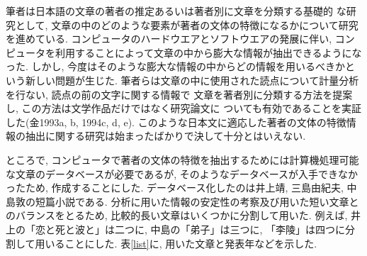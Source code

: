 筆者は日本語の文章の著者の推定あるいは著者別に文章を分類する基礎的
な研究として, 文章の中のどのような要素が著者の文体の特徴になるかについて研究を進めている. 
コンピュータのハードウエアとソフトウエアの発展に伴い, コンピュータを利用することによって文章の中から膨大な情報が抽出できるようになった. しかし, 今度はそのような膨大な情報の中からどの情報を用いるべきかという新しい問題が生じた.
筆者らは文章の中に使用された読点について計量分析を行ない, 読点の前の文字に関する情報で
文章を著者別に分類する方法を提案し, この方法は文学作品だけではなく研究論文に
ついても有効であることを実証した(金1993a, b, 1994c, d, e). このような日本文に適応した著者の文体の特徴情報の抽出に関する研究は始まったばかりで決して十分とはいえない.

ところで, コンピュータで著者の文体の特徴を抽出するためには計算機処理可能な文章のデータベースが必要であるが, そのようなデータベースが入手できなかったため, 作成することにした. データベース化したのは井上靖, 三島由紀夫, 中島敦の短篇小説である. 分析に用いた情報の安定性の考察及び用いた短い文章とのバランスをとるため, 比較的長い文章はいくつかに分割して用いた. 例えば, 井上の「恋と死と波と」は二つに, 中島の「弟子」は三つに, 「李陵」は四つに分割して用いることにした. 表\ref{list}に, 用いた文章と発表年などを示した. 

